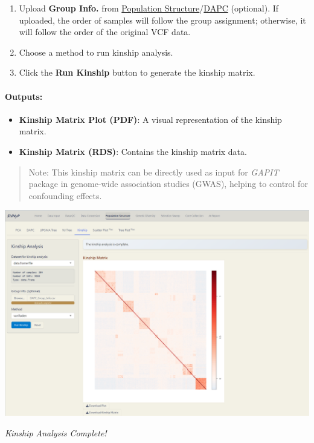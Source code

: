 \documentclass[
]{book}
\begin{document}
\begin{enumerate}
\def\labelenumi{\arabic{enumi}.}
\item
  {Upload} \textbf{Group Info.} from \ul{Population Structure}/\ul{DAPC} (optional). If uploaded, the order of samples will follow the group assignment; otherwise, it will follow the order of the original VCF data.
\item
  Choose a method to run kinship analysis.
\item
  Click the {\textbf{Run Kinship}} button to generate the kinship matrix.
\end{enumerate}

\paragraph*{Outputs:}\label{outputs-9}

\begin{itemize}
\item
  \textbf{Kinship Matrix Plot (PDF)}: A visual representation of the kinship matrix.
\item
  \textbf{Kinship Matrix (RDS)}: Contains the kinship matrix data.
\end{itemize}

\begin{quote}
Note: This kinship matrix can be directly used as input for \emph{GAPIT} package in genome-wide association studies (GWAS), helping to control for confounding effects.
\end{quote}

\includegraphics{images/clipboard-2215706632.png}

\emph{Kinship Analysis Complete!}
\end{document}
